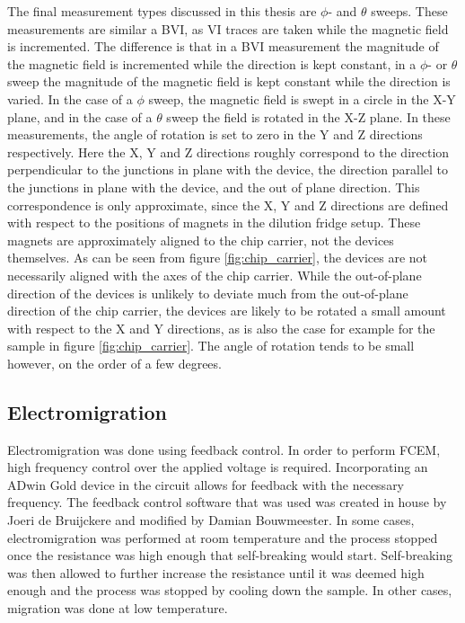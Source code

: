 The final measurement types discussed in this thesis are $\phi$- and $\theta$ sweeps. These measurements are similar a BVI, as VI traces are taken while the magnetic field is incremented. The difference is that in a BVI measurement the magnitude of the magnetic field is incremented while the direction is kept constant, in a $\phi$- or $\theta$ sweep the magnitude of the magnetic field is kept constant while the direction is varied. In the case of a $\phi$ sweep, the magnetic field is swept in a circle in the X-Y plane, and in the case of a $\theta$ sweep the field is rotated in the X-Z plane. In these measurements, the angle of rotation is set to zero in the Y and Z directions respectively. Here the X, Y and Z directions roughly correspond to the direction perpendicular to the junctions in plane with the device, the direction parallel to the junctions in plane with the device, and the out of plane direction. This correspondence is only approximate, since the X, Y and Z directions are defined with respect to the positions of magnets in the dilution fridge setup. These magnets are approximately aligned to the chip carrier, not the devices themselves. As can be seen from figure \ref{fig:chip_carrier}, the devices are not necessarily aligned with the axes of the chip carrier. While the out-of-plane direction of the devices is unlikely to deviate much from the out-of-plane direction of the chip carrier, the devices are likely to be rotated a small amount with respect to the X and Y directions, as is also the case for example for the sample in figure \ref{fig:chip_carrier}. The angle of rotation tends to be small however, on the order of a few degrees. 

\subsection{Electromigration}
Electromigration was done using feedback control. In order to perform FCEM, high frequency control over the applied voltage is required. Incorporating an ADwin Gold device in the circuit allows for feedback with the necessary frequency. The feedback control software that was used was created in house by Joeri de Bruijckere and modified by Damian Bouwmeester. In some cases, electromigration was performed at room temperature and the process stopped once the resistance was high enough that self-breaking would start. Self-breaking was then allowed to further increase the resistance until it was deemed high enough and the process was stopped by cooling down the sample. In other cases, migration was done at low temperature. 















